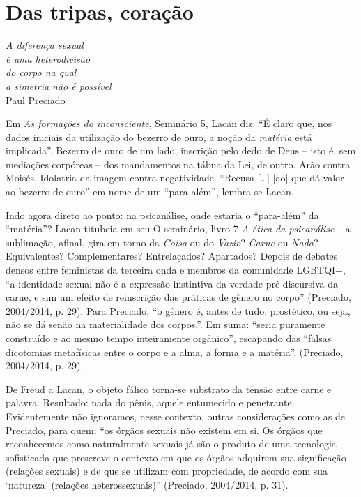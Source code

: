 \section{Das tripas, coração}

\begin{flushright}
\footnotesize
\emph{A diferença sexual\\
é uma heterodivisão\\
do corpo na qual\\
a simetria não é possível}\\
Paul Preciado
\end{flushright}

Em \emph{As formações do inconsciente}, Seminário 5, Lacan diz: ``É
claro que, nos dados iniciais da utilização do bezerro de ouro, a noção
da \emph{matéria} está implicada''. Bezerro de ouro de um lado,
inscrição pelo dedo de Deus -- isto é, sem mediações corpóreas -- dos
mandamentos na tábua da Lei, de outro. Arão contra Moisés. Idolatria da
imagem contra negatividade. ``Recusa {[}\ldots{}{]} {[}ao{]} que dá valor ao
bezerro de ouro'' em nome de um ``para-além'', lembra-se Lacan.

Indo agora direto ao ponto: na psicanálise, onde estaria o ``para-além''
da ``matéria''? Lacan titubeia em seu O seminário, livro 7 \emph{A ética
da psicanálise} -- a sublimação, afinal, gira em torno da \emph{Coisa}
ou do \emph{Vazio}? \emph{Carne} ou \emph{Nada}? Equivalentes?
Complementares? Entrelaçados? Apartados? Depois de debates densos entre
feministas da terceira onda e membros da comunidade LGBTQI+, ``a
identidade sexual não é a expressão instintiva da verdade pré-discursiva
da carne, e sim um efeito de reinscrição das práticas de gênero no
corpo'' (Preciado, 2004/2014, p. 29). Para Preciado, ``o gênero é, antes
de tudo, prostético, ou seja, não se dá senão na materialidade dos
corpos.''. Em suma: ``seria puramente construído e ao mesmo tempo
inteiramente orgânico'', escapando das ``falsas dicotomias metafísicas
entre o corpo e a alma, a forma e a matéria''. (Preciado, 2004/2014, p.
29).

De Freud a Lacan, o objeto fálico torna-se substrato da tensão entre
carne e palavra. Resultado: nada do pênis, aquele entumecido e
penetrante. Evidentemente não ignoramos, nesse contexto, outras
considerações como as de Preciado, para quem: ``os órgãos sexuais não
existem em si. Os órgãos que reconhecemos como naturalmente sexuais já
são o produto de uma tecnologia sofisticada que prescreve o contexto em
que os órgãos adquirem sua significação (relações sexuais) e de que se
utilizam com propriedade, de acordo com sua `natureza' (relações
heterossexuais)'' (Preciado, 2004/2014, p. 31).

